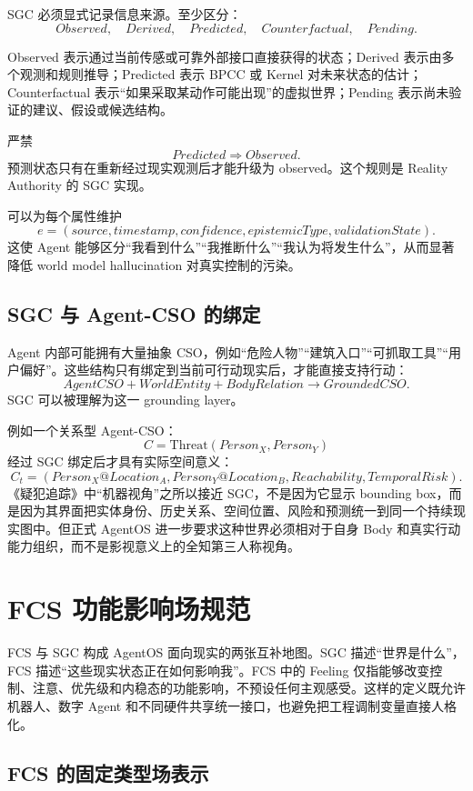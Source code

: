SGC 必须显式记录信息来源。至少区分：
\[
Observed,\quad
Derived,\quad
Predicted,\quad
Counterfactual,\quad
Pending.
\]

Observed 表示通过当前传感或可靠外部接口直接获得的状态；Derived 表示由多个观测和规则推导；Predicted 表示 BPCC 或 Kernel 对未来状态的估计；Counterfactual 表示“如果采取某动作可能出现”的虚拟世界；Pending 表示尚未验证的建议、假设或候选结构。

严禁
\[
Predicted\Rightarrow Observed.
\]
预测状态只有在重新经过现实观测后才能升级为 observed。这个规则是 Reality Authority 的 SGC 实现。

可以为每个属性维护
\[
e=
(source,
timestamp,
confidence,
epistemicType,
validationState).
\]
这使 Agent 能够区分“我看到什么”“我推断什么”“我认为将发生什么”，从而显著降低 world model hallucination 对真实控制的污染。

\section{SGC 与 Agent-CSO 的绑定}

Agent 内部可能拥有大量抽象 CSO，例如“危险人物”“建筑入口”“可抓取工具”“用户偏好”。这些结构只有绑定到当前可行动现实后，才能直接支持行动：
\[
AgentCSO
+
WorldEntity
+
BodyRelation
\rightarrow
GroundedCSO.
\]
SGC 可以被理解为这一 grounding layer。

例如一个关系型 Agent-CSO：
\[
C=
\mathrm{Threat}(Person_X,Person_Y)
\]
经过 SGC 绑定后才具有实际空间意义：
\[
C_t=
(
Person_X@Location_A,
Person_Y@Location_B,
Reachability,
TemporalRisk
).
\]
《疑犯追踪》中“机器视角”之所以接近 SGC，不是因为它显示 bounding box，而是因为其界面把实体身份、历史关系、空间位置、风险和预测统一到同一个持续现实图中。但正式 AgentOS 进一步要求这种世界必须相对于自身 Body 和真实行动能力组织，而不是影视意义上的全知第三人称视角。


\chapter{FCS 功能影响场规范}
\label{app:fcs}

\begin{chapterlead}
FCS 与 SGC 构成 AgentOS 面向现实的两张互补地图。SGC 描述“世界是什么”，FCS 描述“这些现实状态正在如何影响我”。FCS 中的 Feeling 仅指能够改变控制、注意、优先级和内稳态的功能影响，不预设任何主观感受。这样的定义既允许机器人、数字 Agent 和不同硬件共享统一接口，也避免把工程调制变量直接人格化。
\end{chapterlead}

\section{FCS 的固定类型场表示}

